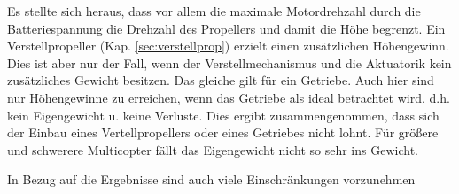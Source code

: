 Es stellte sich heraus, dass vor allem die maximale Motordrehzahl durch die Batteriespannung die Drehzahl des Propellers und damit die Höhe begrenzt. Ein Verstellpropeller (Kap. \ref{sec:verstellprop}) erzielt einen zusätzlichen Höhengewinn. Dies ist aber nur der Fall, wenn der Verstellmechanismus und die Aktuatorik kein zusätzliches Gewicht besitzen. Das gleiche gilt für ein Getriebe. Auch hier sind nur Höhengewinne zu erreichen, wenn das Getriebe als ideal betrachtet wird, d.h. kein Eigengewicht u. keine Verluste. Dies ergibt zusammengenommen, dass sich der Einbau eines Vertellpropellers oder eines Getriebes nicht lohnt. Für größere und schwerere Multicopter fällt das Eigengewicht nicht so sehr ins Gewicht. 





In Bezug auf die Ergebnisse sind auch viele Einschränkungen vorzunehmen

